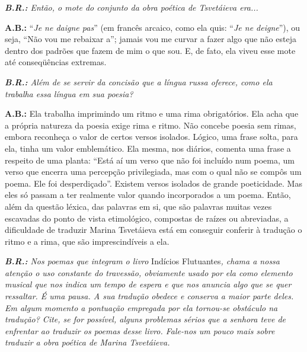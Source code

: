 \emph{\textbf{B.R.:} Então, o mote do conjunto da obra poética de
Tsvetáieva era...}

\textbf{A.B.:} ``\emph{Je ne daigne pas}'' (em francês arcaico, como ela
quis: ``\emph{Je ne deigne}''), ou seja, ``Não vou me rebaixar a'';
jamais vou me curvar a fazer algo que não esteja dentro dos padrões que
fazem de mim o que sou. E, de fato, ela viveu esse mote até
conseqüências extremas.

\emph{\textbf{B.R.:} Além de se servir da concisão que a língua russa
oferece, como ela trabalha essa língua em sua poesia?}

\textbf{A.B.:} Ela trabalha imprimindo um ritmo e uma rima obrigatórios.
Ela acha que a própria natureza da poesia exige rima e ritmo. Não
concebe poesia sem rimas, embora reconheça o valor de certos versos
isolados. Lógico, uma frase solta, para ela, tinha um valor emblemático.
Ela mesma, nos diários, comenta uma frase a respeito de uma planta:
``Está aí um verso que não foi incluído num poema, um verso que encerra
uma percepção privilegiada, mas com o qual não se compôs um poema. Ele
foi desperdiçado''. Existem versos isolados de grande poeticidade. Mas
eles só passam a ter realmente valor quando incorporados a um poema.
Então, além da questão léxica, das palavras em si, que são palavras
muitas vezes escavadas do ponto de vista etimológico, compostas de
raízes ou abreviadas, a dificuldade de traduzir Marina Tsvetáieva está
em conseguir conferir à tradução o ritmo e a rima, que são
imprescindíveis a ela.

\emph{\textbf{B.R.:} Nos poemas que integram o livro} Indícios
Flutuantes\emph{, chama a nossa atenção o uso constante do travessão,
obviamente usado por ela como elemento musical que nos indica um tempo
de espera e que nos anuncia algo que se quer ressaltar. É uma pausa. A
sua tradução obedece e conserva a maior parte deles. Em algum momento a
pontuação empregada por ela tornou-se obstáculo na tradução? Cite, se
for possível, alguns problemas sérios que a senhora teve de enfrentar ao
traduzir os poemas desse livro. Fale-nos um pouco mais sobre traduzir a
obra poética de Marina Tsvetáieva.}

